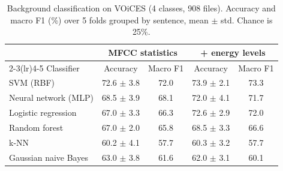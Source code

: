 \begin{table}[H]\centering\small\caption{Background classification on VOiCES (4 classes, 908 files). Accuracy and macro F1 (\%) over 5 folds grouped by sentence, mean $\pm$ std. Chance is 25\%.}\label{tab:bg}
\setlength{\tabcolsep}{4pt}\begin{tabular}{lcccc}\toprule & \multicolumn{2}{c}{MFCC statistics} & \multicolumn{2}{c}{+ energy levels}\\\cmidrule(lr){2-3}\cmidrule(lr){4-5}
Classifier & Accuracy & Macro F1 & Accuracy & Macro F1\\\midrule
SVM (RBF) & 72.6 $\pm$ 3.8 & 72.0 & 73.9 $\pm$ 2.1 & 73.3\\
Neural network (MLP) & 68.5 $\pm$ 3.9 & 68.1 & 72.0 $\pm$ 4.1 & 71.7\\
Logistic regression & 67.0 $\pm$ 3.3 & 66.3 & 72.6 $\pm$ 2.9 & 72.0\\
Random forest & 67.0 $\pm$ 2.0 & 65.8 & 68.5 $\pm$ 3.3 & 66.6\\
k-NN & 60.2 $\pm$ 4.1 & 57.7 & 60.3 $\pm$ 3.2 & 57.7\\
Gaussian naive Bayes & 63.0 $\pm$ 3.8 & 61.6 & 62.0 $\pm$ 3.1 & 60.1\\
\bottomrule\end{tabular}\end{table}
